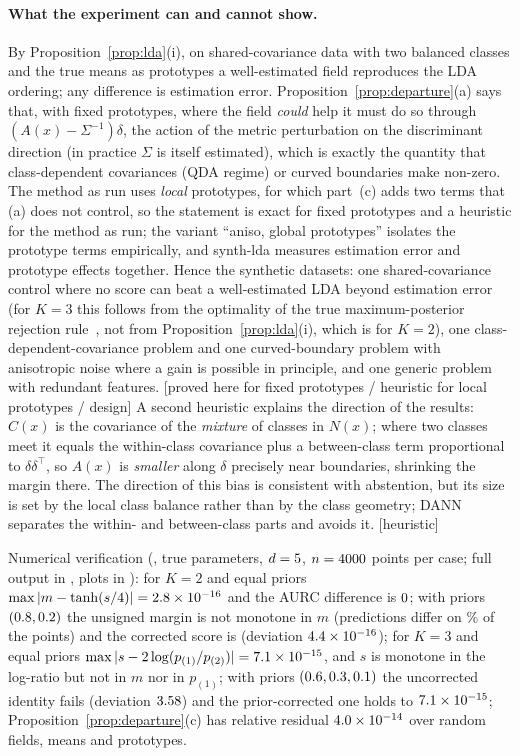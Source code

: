 \documentclass[10pt,a4paper]{article}
\theoremstyle{plain}
\theoremstyle{definition}
\theoremstyle{remark}
\newcommand{\Sig}{\Sigma}
\newcommand{\status}[1]{\textsf{\small [#1]}}
\begin{document}
\paragraph{What the experiment can and cannot show.} By Proposition~\ref{prop:lda}(i), on shared-covariance data with two balanced classes and the true means as prototypes a well-estimated field reproduces the LDA ordering; any difference is estimation error. Proposition~\ref{prop:departure}(a) says that, with fixed prototypes, where the field \emph{could} help it must do so through $(A(x)-\Sig^{-1})\delta$, the action of the metric perturbation on the discriminant direction (in practice $\Sig$ is itself estimated), which is exactly the quantity that class-dependent covariances (QDA regime) or curved boundaries make non-zero. The method as run uses \emph{local} prototypes, for which part~(c) adds two terms that (a) does not control, so the statement is exact for fixed prototypes and a heuristic for the method as run; the variant ``aniso, global prototypes'' isolates the prototype terms empirically, and synth-lda measures estimation error and prototype effects together. Hence the synthetic datasets: one shared-covariance control where no score can beat a well-estimated LDA beyond estimation error (for $K=3$ this follows from the optimality of the true maximum-posterior rejection rule~\citep{chow1970}, not from Proposition~\ref{prop:lda}(i), which is for $K=2$), one class-dependent-covariance problem and one curved-boundary problem with anisotropic noise where a gain is possible in principle, and one generic problem with redundant features. \status{proved here for fixed prototypes / heuristic for local prototypes / design} A second heuristic explains the direction of the results: $C(x)$ is the covariance of the \emph{mixture} of classes in $N(x)$; where two classes meet it equals the within-class covariance plus a between-class term proportional to $\delta\delta^{\top}$, so $A(x)$ is \emph{smaller} along $\delta$ precisely near boundaries, shrinking the margin there. The direction of this bias is consistent with abstention, but its size is set by the local class balance rather than by the class geometry; DANN separates the within- and between-class parts and avoids it. \status{heuristic}

Numerical verification (, true parameters, $d=5$, $n=4000$ points per case; full output in , plots in ): for $K=2$ and equal priors $\max|m-\tanh(s/4)|=2.8\times 10^{-16}$ and the AURC difference is $0$; with priors $(0.8,0.2)$ the unsigned margin is not monotone in $m$ (predictions differ on \IdUneqFrac\% of the points) and the corrected score is (deviation $4.4\times 10^{-16}$); for $K=3$ and equal priors $\max|s-2\log(p_{(1)}/p_{(2)})|=7.1\times 10^{-15}$, and $s$ is monotone in the log-ratio but not in $m$ nor in $p_{(1)}$; with priors $(0.6, 0.3, 0.1)$ the uncorrected identity fails (deviation $3.58$) and the prior-corrected one holds to $7.1\times 10^{-15}$; Proposition~\ref{prop:departure}(c) has relative residual $4.0\times 10^{-14}$ over \IdLocalCases{} random fields, means and prototypes.
\end{document}
